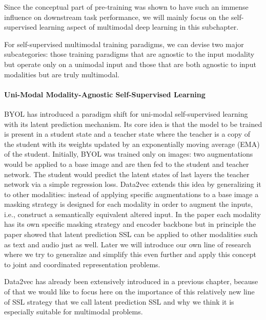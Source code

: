 \documentclass[
]{krantz}
\begin{document}
Since the conceptual part of pre-training was shown to have such an immense influence on downstream task performance, we will mainly focus on the self-supervised learning aspect of multimodal deep learning in this subchapter.

For self-supervised multimodal training paradigms, we can devise two major subcategories: those training paradigms that are agnostic to the input modality but operate only on a unimodal input and those that are both agnostic to input modalities but are truly multimodal.

\hypertarget{uni-modal-modality-agnostic-self-supervised-learning}{%
\paragraph{Uni-Modal Modality-Agnostic Self-Supervised Learning}\label{uni-modal-modality-agnostic-self-supervised-learning}}

BYOL \citep{grill2020bootstrap} has introduced a paradigm shift for uni-modal self-supervised learning with its latent prediction mechanism. Its core idea is that the model to be trained is present in a student state and a teacher state where the teacher is a copy of the student with its weights updated by an exponentially moving average (EMA) of the student. Initially, BYOL was trained only on images: two augmentations would be applied to a base image and are then fed to the student and teacher network. The student would predict the latent states of last layers the teacher network via a simple regression loss. Data2vec extends this idea by generalizing it to other modalities: instead of applying specific augmentations to a base image a masking strategy is designed for each modality in order to augment the inputs, i.e., construct a semantically equivalent altered input. In the paper each modality has its own specific masking strategy and encoder backbone but in principle the paper showed that latent prediction SSL can be applied to other modalities such as text and audio just as well. Later we will introduce our own line of research where we try to generalize and simplify this even further and apply this concept to joint and coordinated representation problems.

Data2vec \citep{baevski2022data2vec} has already been extensively introduced in a previous chapter, because of that we would like to focus here on the importance of this relatively new line of SSL strategy that we call latent prediction SSL and why we think it is especially suitable for multimodal problems.
\end{document}
